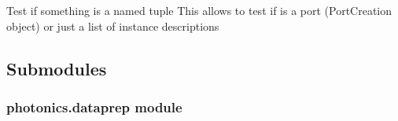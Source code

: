 \documentclass[a4paper,10pt,english]{sphinxmanual}
\begin{document}
\begin{fulllineitems}
\label{\detokenize{photonics/photonics:kppc.photonics.isnamedtupleinstance}}
Test if something is a named tuple
This allows to test if  is a port (PortCreation object) or just a list of instance descriptions

\end{fulllineitems}



\subsection{Submodules}
\label{\detokenize{photonics/photonics:submodules}}

\subsubsection{photonics.dataprep module}
\label{\detokenize{photonics/photonics:module-kppc.photonics.dataprep}}\label{\detokenize{photonics/photonics:photonics-dataprep-module}}
\end{document}
